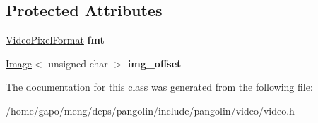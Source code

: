 \subsection*{Protected Attributes}
\begin{DoxyCompactItemize}
\item 
\hyperlink{structpangolin_1_1_video_pixel_format}{Video\+Pixel\+Format} {\bfseries fmt}\hypertarget{classpangolin_1_1_stream_info_a3a0ccbc2a79d02d66d308a6c88e13955}{}\label{classpangolin_1_1_stream_info_a3a0ccbc2a79d02d66d308a6c88e13955}

\item 
\hyperlink{structpangolin_1_1_image}{Image}$<$ unsigned char $>$ {\bfseries img\+\_\+offset}\hypertarget{classpangolin_1_1_stream_info_a46eaf5cc5214d8249394f0c837246929}{}\label{classpangolin_1_1_stream_info_a46eaf5cc5214d8249394f0c837246929}

\end{DoxyCompactItemize}


The documentation for this class was generated from the following file\+:\begin{DoxyCompactItemize}
\item 
/home/gapo/meng/deps/pangolin/include/pangolin/video/video.\+h\end{DoxyCompactItemize}
